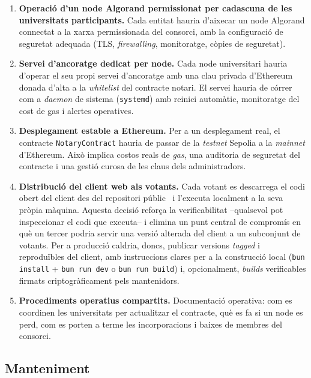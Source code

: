 \begin{enumerate}
    \item \textbf{Operació d'un node Algorand permissionat per cadascuna de les universitats participants.} Cada entitat
    hauria d'aixecar un node Algorand connectat a la xarxa permissionada del consorci, amb la configuració de seguretat
    adequada (TLS, \emph{firewalling}, monitoratge, còpies de seguretat).

    \item \textbf{Servei d'ancoratge dedicat per node.} Cada node universitari hauria d'operar el seu propi servei
    d'ancoratge amb una clau privada d'Ethereum donada d'alta a la \emph{whitelist} del contracte notari.
    El servei hauria de córrer com a \emph{daemon} de sistema (\texttt{systemd}) amb reinici automàtic, monitoratge del
    cost de gas i alertes operatives.

    \item \textbf{Desplegament estable a Ethereum.} Per a un desplegament real, el contracte \texttt{NotaryContract}
    hauria de passar de la \emph{testnet} Sepolia a la \emph{mainnet} d'Ethereum.
    Això implica costos reals de \emph{gas}, una auditoria de seguretat del contracte i una gestió curosa de les claus
    dels administradors.

    \item \textbf{Distribució del client web als votants.} Cada votant es descarrega el codi obert del client des del
    repositori públic~\cite{demochainrepo} i l'executa localment a la seva pròpia màquina.
    Aquesta decisió reforça la verificabilitat --qualsevol pot inspeccionar el codi que executa-- i elimina un punt
    central de compromís en què un tercer podria servir una versió alterada del client a un subconjunt de votants.
    Per a producció caldria, doncs, publicar versions \emph{tagged} i reproduïbles del client, amb instruccions
    clares per a la construcció local (\texttt{bun install} + \texttt{bun run dev} o \texttt{bun run build}) i,
    opcionalment, \emph{builds} verificables firmats criptogràficament pels mantenidors.

    \item \textbf{Procediments operatius compartits.} Documentació operativa: com es coordinen les universitats per
    actualitzar el contracte, què es fa si un node es perd, com es porten a terme les incorporacions i baixes de membres
    del consorci.
\end{enumerate}

\subsection{Manteniment}
\label{subsec:manteniment}

